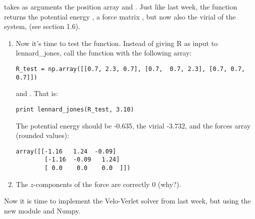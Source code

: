 \documentclass{article}
\begin{document}
 takes as arguments the position array  and .
Just like last week, the  function returns the potential energy ,
a force matrix , but now also the virial of the system,  (see section 1.6).\\


\begin{enumerate}[resume]

    \item Now it's time to test the  function.
        Instead of giving R as input to lennard\_jones, call the function with the following  array:

\begin{lstlisting}
R_test = np.array([[0.7, 2.3, 0.7], [0.7,  0.7, 2.3], [0.7, 0.7, 0.7]])
\end{lstlisting}

    and . That is:

\begin{lstlisting}
print lennard_jones(R_test, 3.10)
\end{lstlisting}

    The potential energy should be -0.635, the virial -3.732,
    and the forces array (rounded values):

\begin{lstlisting}
array([[-1.16   1.24  -0.09]
        [-1.16  -0.09   1.24]
        [ 0.0    0.0    0.0  ]])
\end{lstlisting}

    \item
    The $z$-components of the force are correctly 0 (why?).

\end{enumerate}

Now it is time to implement the Velo-Verlet solver from last week, but using the new module and Numpy.
\end{document}
